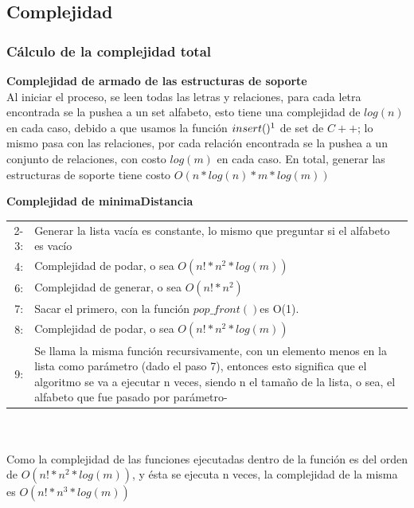 \documentclass[a4paper, 10pt]{article}
\begin{document}
\subsection{Complejidad}

\subsubsection{Cálculo de la complejidad total}

\textbf{Complejidad de armado de las estructuras de soporte}\\

Al iniciar el proceso, se leen todas las letras y relaciones, para cada letra encontrada se la pushea a un set alfabeto, esto tiene una complejidad de $log (n)$ en cada caso, debido a que usamos la función $insert()\footnotemark$ de set de $C++$; lo mismo pasa con las relaciones, por cada relación encontrada se la pushea a un conjunto de relaciones, con costo $log (m)$ en cada caso. En total, generar las estructuras de soporte tiene costo $O(n * log (n) * m * log (m))$\\
\newpage

\textbf{Complejidad de minimaDistancia}\\

\begin{tabular}{rp{15.8cm}}
2-3: & Generar la lista vacía es constante, lo mismo que preguntar si el alfabeto es vacío\\
4:& Complejidad de podar, o sea $O(n! * n^{2} * log (m))$\\
6: & Complejidad de generar, o sea $O(n! * n^{2})$ \\
7: & Sacar el primero, con la función $pop\_front()$\footnotemark es O(1).\\
8: & Complejidad de podar, o sea $O(n! * n^{2} * log (m))$\\
9: & Se llama la misma función recursivamente, con un elemento menos en la lista como parámetro (dado el paso 7), entonces esto significa que el algoritmo se va a ejecutar n veces, siendo n el tamaño de la lista, o sea, el alfabeto que fue pasado por parámetro-\\
\end{tabular}
\\\\

Como la complejidad de las funciones ejecutadas dentro de la función es del orden de $O(n! * n^{2} * log (m))$, y ésta se ejecuta n veces, la complejidad de la misma es $O(n! * n^{3}  * log (m))$\\
\end{document}
